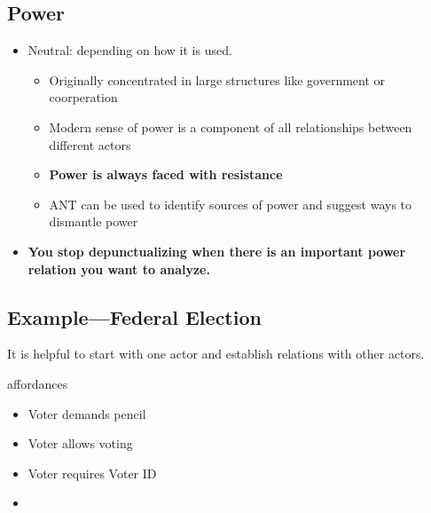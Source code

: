 \documentclass[a4paper]{article}
\numberwithin{equation}{section}
\begin{document}
\subsection{Power}
\begin{itemize}
    \item Neutral: depending on how it is used.
    \begin{itemize}
        \item Originally concentrated in large structures like government or coorperation
        \item Modern sense of power is a component of all relationships between different actors
        \item \textbf{Power is always faced with resistance}
        \item ANT can be used to identify sources of power and suggest ways to dismantle power   
    \end{itemize}
    \item \textbf{You stop depunctualizing when there is an important power relation you want to analyze.}
\end{itemize}

\subsection{Example---Federal Election}

It is helpful to start with one actor and establish relations with other actors. 

affordances
\begin{itemize}
    \item Voter demands pencil
    \item Voter allows voting
    \item Voter requires Voter ID
    \item 
\end{itemize}
\end{document}

